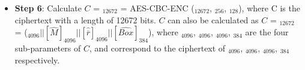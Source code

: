 \documentclass[main\_\_EN.tex]{subfiles}
\begin{document}
\begin{itemize}
    \item {\bfseries Step 6}: Calculate \begin{math}C\end{math} = \begin{math}[C]_{12672}\end{math} =
            AES-CBC-ENC (\begin{math}[P]_{12672}\end{math}, \begin{math}[RSA\_DS\_KEY]_{256}\end{math}, \begin{math}[IV]_{128}\end{math}), where C is the ciphertext with a length of 12672 bits.
            \begin{math}C\end{math} can also be calculated as
            \begin{math}C\end{math} = \begin{math}[C]_{12672}\end{math} =
            (\begin{math}
            [\widehat{Y}]_{4096} ||
            [\widehat{M}]_{4096} ||
            [\widehat{ \overline{r} }]_{4096} ||
            [\widehat{Box}]_{384}
            \end{math}),
            where
            \begin{math} [\widehat{Y}]_{4096} \end{math},
            \begin{math} [\widehat{M}]_{4096} \end{math},
            \begin{math} [\widehat{ \overline{r} }]_{4096} \end{math},
            \begin{math} [\widehat{Box}]_{384} \end{math}
            are the four sub-parameters of \begin{math}C\end{math}, and correspond to the ciphertext of
            \begin{math} [Y]_{4096} \end{math},
            \begin{math} [M]_{4096} \end{math},
            \begin{math} [\overline{r}]_{4096} \end{math},
            \begin{math} [Box]_{384} \end{math}
            respectively.

\end{itemize}
\end{document}
